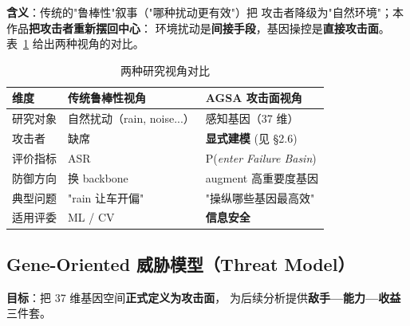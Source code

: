 \documentclass[a4paper,12pt,fontset=fandol]{ctexart}
\begin{document}
\noindent\textbf{含义}：传统的"鲁棒性"叙事（"哪种扰动更有效"）把
攻击者降级为"自然环境"；本作品\textbf{把攻击者重新摆回中心}：
环境扰动是\textbf{间接手段}，基因操控是\textbf{直接攻击面}。
表~\ref{tab:perspective} 给出两种视角的对比。

\begin{table}[H]
\centering
\small
\caption{两种研究视角对比}
\label{tab:perspective}
\begin{tabularx}{\linewidth}{lXX}
\toprule
\textbf{维度} & \textbf{传统鲁棒性视角} & \textbf{AGSA 攻击面视角} \\
\midrule
研究对象 & 自然扰动（rain, noise...）& 感知基因（37 维）\\
攻击者 & 缺席 & \textbf{显式建模} (见 §2.6)\\
评价指标 & ASR & P(\textit{enter Failure Basin})\\
防御方向 & 换 backbone & augment 高重要度基因\\
典型问题 & "rain 让车开偏" & "操纵哪些基因最高效"\\
适用评委 & ML / CV & \textbf{信息安全} \\
\bottomrule
\end{tabularx}
\end{table}

\subsection{Gene-Oriented 威胁模型（Threat Model）}

\noindent\textbf{目标}：把 37 维基因空间\textbf{正式定义为攻击面}，
为后续分析提供\textbf{敌手—能力—收益}三件套。
\end{document}

